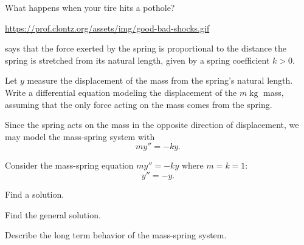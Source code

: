 

\begin{applicationActivities}


\begin{observation}
What happens when your tire hits a pothole?

\url{https://prof.clontz.org/assets/img/good-bad-shocks.gif}

\end{observation}

%

\begin{activity}{5}
 says that the force exerted by the spring is proportional to the distance 
the spring is stretched from its natural length, given by a spring coefficient \(k>0\).

\begin{center}
\springmass
\end{center}
\vfill

Let \(y\) measure the displacement of the mass from the spring's natural length.
Write a differential equation modeling the displacement of the \(m\operatorname{kg}\) mass,
assuming that the only force acting on the mass comes from the spring.
\end{activity}

\begin{observation}
Since the spring acts on the mass in the opposite direction of displacement, we
may model the mass-spring system with
\[my''=-ky.\]
\vfill
\begin{center}
\springmass
\end{center}
\end{observation}

\begin{activity}{15}
Consider the mass-spring equation \(my''=-ky\) where \(m=k=1\): 
\[y''=-y.\]
\begin{subactivity}
Find a solution.
\end{subactivity}
\begin{subactivity}
Find the general solution.
\end{subactivity}
\begin{subactivity}
Describe the long term behavior of the mass-spring system.
\end{subactivity}
\end{activity}


\end{applicationActivities}
